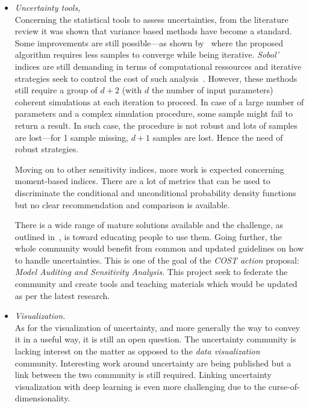 \begin{itemize}

\item \emph{Uncertainty tools,}\hfill\\
Concerning the statistical tools to assess uncertainties, from the literature review it was shown that variance based methods have become a standard. Some improvements are still possible---as shown by~\cite{Saltelli2017} where the proposed algorithm requires less samples to converge while being iterative. \emph{Sobol'} indices are still demanding in terms of computational ressources and iterative strategies seek to control the cost of such analysis~\cite{Terraz2017}. However, these methods still require a group of $d + 2$ (with $d$ the number of input parameters) coherent simulations at each iteration to proceed. In case of a large number of parameters and a complex simulation procedure, some sample might fail to return a result. In such case, the procedure is not robust and lots of samples are lost---for 1 sample missing, $d + 1$ samples are lost. Hence the need of robust strategies.

Moving on to other sensitivity indices, more work is expected concerning moment-based indices. There are a lot of metrics that can be used to discriminate the conditional and unconditional probability density functions but no clear recommendation and comparison is available.

There is a wide range of mature solutions available and the challenge, as outlined in~\cite{Saltelli2019}, is toward educating people to use them. Going further, the whole community would benefit from common and updated guidelines on how to handle uncertainties. This is one of the goal of the \emph{COST action} proposal: \emph{Model Auditing and Sensitivity Analysis}. This project seek to federate the community and create tools and teaching materials which would be updated as per the latest research.

\item \emph{Visualization.}\hfill\\
As for the visualization of uncertainty, and more generally the way to convey it in a useful way, it is still an open question. The uncertainty community is lacking interest on the matter as opposed to the \emph{data visualization} community. Interesting work around uncertainty are being published but a link between the two community is still required. Linking uncertainty visualization with deep learning is even more challenging due to the curse-of-dimensionality.


\end{itemize}
